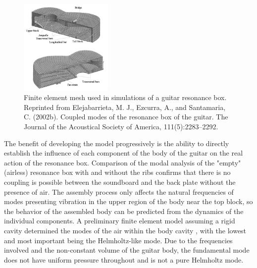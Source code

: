 \documentclass[
reprint,amsmath,amssymb,showpacs,citeautoscript,prb,twocolumn,notitlepage,floatfix
]{revtex4-1}
\begin{document}
\begin{figure}[ht]
    \begin{center}
        \includegraphics[width=0.4\textwidth]{images/elejabarrieta-fe-model.jpg}
        \caption{Finite element mesh used in simulations of a guitar resonance box. Reprinted from Elejabarrieta, M. J., Ezcurra, A., and Santamaria, C. (2002b). Coupled modes of the resonance box of the guitar. The Journal of the Acoustical Society of America, 111(5):2283–2292.}
        \label{fig:finiteelement}
    \end{center}
\end{figure}

The benefit of developing the model progressively is the ability to directly establish the influence of each component of the body of the guitar on the real action of the resonance box. Comparison of the modal analysis of the "empty" (airless) resonance box with and without the ribs confirms that there is no coupling is possible between the soundboard and the back plate without the presence of air. The assembly process only affects the natural frequencies of modes presenting vibration in the upper region of the body near the top block, so the behavior of the assembled body can be predicted from the dynamics of the individual components. A preliminary finite element model assuming a rigid cavity determined the modes of the air within the body cavity \cite{elejabarrieta2002:aircavitymodes}, with the lowest and most important being the Helmholtz-like mode. Due to the frequencies involved and the non-constant volume of the guitar body, the fundamental mode does not have uniform pressure throughout and is not a pure Helmholtz mode.
\end{document}
